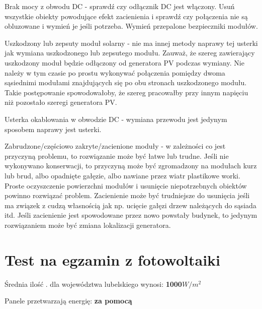 \documentclass[12pt,a4paper]{article}
\begin{document}
 

Brak mocy z obwodu DC - sprawdź czy odłącznik DC jest włączony. Usuń 
wszystkie obiekty powodujące efekt zacienienia i sprawdź czy połączenia 
nie są obluzowane i wymień je jeśli potrzeba. Wymień przepalone 
bezpieczniki modułów. 

 

Uszkodzony lub zepsuty moduł solarny - nie ma innej metody naprawy tej 
usterki jak wymiana uszkodzonego lub zepsutego modułu. Zauważ, że szereg 
zawierający uszkodzony moduł będzie odłączony od generatora PV podczas 
wymiany. Nie należy w tym czasie po prostu wykonywać połączenia pomiędzy 
dwoma sąsiednimi modułami znajdujących się po obu stronach uszkodzonego 
modułu. Takie postępowanie spowodowałoby, że szereg pracowałby przy 
innym napięciu niż pozostało szeregi generatora PV. 

 

Usterka okablowania w obwodzie DC - wymiana przewodu jest jedynym 
sposobem naprawy jest usterki. 

 

Zabrudzone/częściowo zakryte/zacienione moduły - w zależności co jest 
przyczyną problemu, to rozwiązanie może być łatwe lub trudne. Jeśli nie 
wykonywano konserwacji, to przyczyną może być zgromadzony na modułach 
kurz lub brud, albo opadnięte gałęzie, albo nawiane przez wiatr 
plastikowe worki. Proste oczyszczenie powierzchni modułów i usunięcie 
niepotrzebnych obiektów powinno rozwiązać problem. Zacienienie może być 
trudniejsze do usunięcia jeśli ma związek z cudzą własnością jak np. 
ucięcie gałęzi drzew należących do sąsiada itd. Jeśli zacienienie jest 
spowodowane przez nowo powstały budynek, to jedynym rozwiązaniem może 
być zmiana lokalizacji generatora. 

\section{Test na egzamin z fotowoltaiki}

Średnia ilość .
 dla województwa lubelskiego wynosi: \textbf{1000${W/m^{2}}$}

Panele przetwarzają energię: \textbf{za pomocą }
\end{document}

